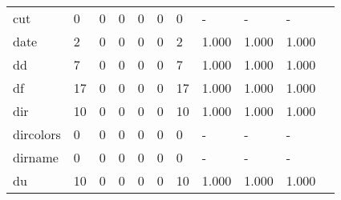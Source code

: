 \begin{longtable}{lp{1.10cm}p{1.10cm}p{1.10cm}p{1.10cm}p{1.10cm}p{1.10cm}p{1.10cm}p{1.10cm}p{1.10cm}p{1.10cm}}
cut       &                      0 &                                  0 &                                 0 &                                0 &                                 0 &                               0 &                              - &                                     - &                                   - \\
date      &                      2 &                                  0 &                                 0 &                                0 &                                 0 &                               2 &                          1.000 &                                 1.000 &                               1.000 \\
dd        &                      7 &                                  0 &                                 0 &                                0 &                                 0 &                               7 &                          1.000 &                                 1.000 &                               1.000 \\
df        &                     17 &                                  0 &                                 0 &                                0 &                                 0 &                              17 &                          1.000 &                                 1.000 &                               1.000 \\
dir       &                     10 &                                  0 &                                 0 &                                0 &                                 0 &                              10 &                          1.000 &                                 1.000 &                               1.000 \\
dircolors &                      0 &                                  0 &                                 0 &                                0 &                                 0 &                               0 &                              - &                                     - &                                   - \\
dirname   &                      0 &                                  0 &                                 0 &                                0 &                                 0 &                               0 &                              - &                                     - &                                   - \\
du        &                     10 &                                  0 &                                 0 &                                0 &                                 0 &                              10 &                          1.000 &                                 1.000 &                               1.000 \\

\end{longtable}
